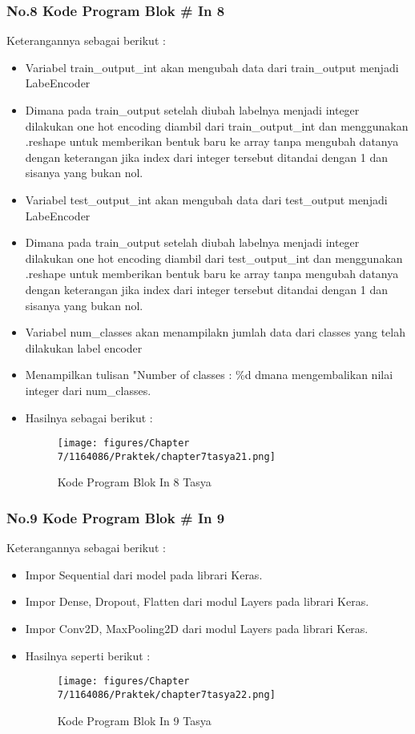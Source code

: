 \subsubsection{No.8 Kode Program Blok \# In 8}

Keterangannya sebagai berikut :
\begin{itemize}
\item Variabel train\_output\_int  akan mengubah data dari train\_output menjadi LabeEncoder
\item Dimana pada train\_output setelah diubah labelnya menjadi integer dilakukan one hot encoding diambil dari train\_output\_int dan menggunakan .reshape untuk memberikan bentuk baru ke array tanpa mengubah datanya dengan keterangan jika index dari integer tersebut ditandai dengan 1 dan sisanya yang bukan nol.
\item Variabel test\_output\_int  akan mengubah data dari test\_output menjadi LabeEncoder
\item Dimana pada train\_output setelah diubah labelnya menjadi integer dilakukan one hot encoding diambil dari test\_output\_int dan menggunakan .reshape untuk memberikan bentuk baru ke array tanpa mengubah datanya dengan keterangan jika index dari integer tersebut ditandai dengan 1 dan sisanya yang bukan nol.
\item Variabel num\_classes akan menampilakn jumlah data dari classes yang telah dilakukan label encoder
\item Menampilkan tulisan "Number of classes : \%d dmana mengembalikan nilai integer dari num\_classes.
\item Hasilnya sebagai berikut : 
\begin{figure}[ht]
\centering
\texttt{[image: figures/Chapter 7/1164086/Praktek/chapter7tasya21.png]}
\caption{Kode Program Blok In 8 Tasya}
\label{Praktek}
\end{figure}
\end{itemize}

\subsubsection{No.9 Kode Program Blok \# In 9}

Keterangannya sebagai berikut :
\begin{itemize}
\item Impor Sequential dari model pada librari Keras.
\item Impor Dense, Dropout, Flatten dari modul Layers pada librari Keras.
\item Impor Conv2D, MaxPooling2D dari modul Layers pada librari Keras.
\item Hasilnya seperti berikut : 
\begin{figure}[ht]
\centering
\texttt{[image: figures/Chapter 7/1164086/Praktek/chapter7tasya22.png]}
\caption{Kode Program Blok In 9 Tasya}
\label{Praktek}
\end{figure}
\end{itemize}


